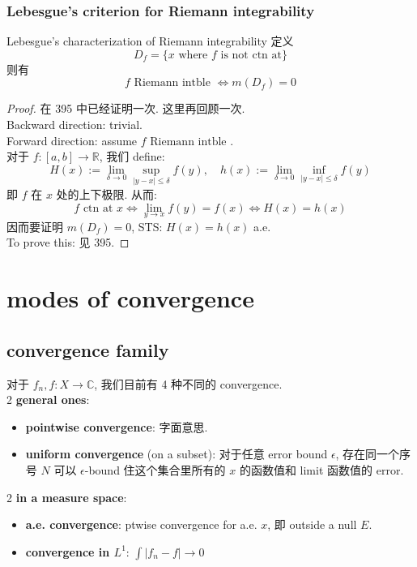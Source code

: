 \documentclass[lang=cn,11pt]{elegantbook}
\begin{document}
\subsection{Lebesgue's criterion for Riemann integrability}

\begin{theorem}{Lebesgue's characterization of Riemann integrability}
     定义 \[
    D_f = \{ x \text{ where } f \text{ is not ctn at}   \}
    \]
    则有 \[
    f \text{ Riemann intble } \Longleftrightarrow m(D_f) = 0 \]
\end{theorem}
\begin{proof}
    在 395 中已经证明一次. 这里再回顾一次.\\
    Backward direction: trivial. \\
    Forward direction: assume $   f \text{ Riemann intble }$. \\
    对于 $f:[a,b] \to \mathbb{R}$,  我们 define: \[
    H(x)  := \lim_{\delta \to 0} \sup_{|y-x| \leq \delta} f(y), \quad h(x) := \lim_{\delta \to 0} \inf_{|y-x| \leq \delta} f(y)
     \]
    即 $f$ 在 $x$ 处的上下极限. 从而: \[
    f \text{ ctn at } x \Longleftrightarrow  \lim_{y \to x} f(y) = f(x)  \Longleftrightarrow H(x) = h(x)
    \]因而要证明 $m(D_f) = 0$, STS: $H(x) = h(x)$ a.e.\\
To prove this: 见 395.
\end{proof}





\chapter{modes of convergence}
\section{convergence family}
对于 $f_n,f:X \rightarrow \mathbb{C}$, 我们目前有 4 种不同的 convergence.\\
2 \textbf{general ones}:
\begin{itemize}
    \item \textbf{pointwise convergence}: 字面意思. 
    \item \textbf{uniform convergence} (on a subset): 对于任意 error bound $\epsilon$, 存在同一个序号 $N$ 可以 $\epsilon$-bound 住这个集合里所有的 $x$ 的函数值和 limit 函数值的 error. 
\end{itemize}
2 \textbf{in a measure space}:
\begin{itemize}
    \item \textbf{a.e. convergence}: ptwise convergence for a.e. $x$, 即 outside a null $E$.
    \item \textbf{convergence in $L^1$}: $\int |f_n -f| \rightarrow 0$
\end{itemize}
\end{document}
